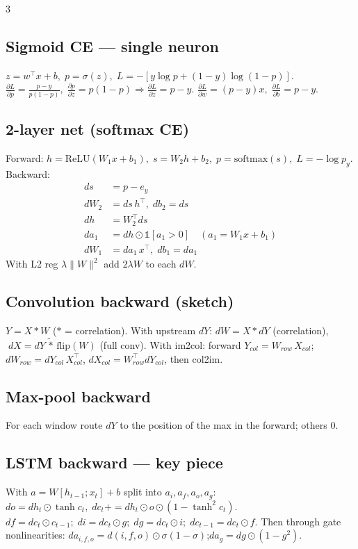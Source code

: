 \documentclass[a4paper,9pt,landscape]{scrartcl}
\newcommand{\softmax}{\mathrm{softmax}}
\newcommand{\relu}{\mathrm{ReLU}}
\newcommand{\dd}[2]{\frac{\partial #1}{\partial #2}}
\begin{document}
\begin{multicols*}{3}
\subsection{Sigmoid CE — single neuron}
$z=w^\top x+b,\;p=\sigma(z),\;L=-[y\log p+(1-y)\log(1-p)]$.
$\dd{L}{p}=\frac{p-y}{p(1-p)},\;\dd{p}{z}=p(1-p)\Rightarrow\dd{L}{z}=p-y$.
$\dd{L}{w}=(p-y)x,\;\dd{L}{b}=p-y$.

\subsection{2-layer net (softmax CE)}
Forward: $h=\relu(W_1 x+b_1),\;s=W_2 h+b_2,\;p=\softmax(s),\;L=-\log p_y$.\\
Backward:
\begin{align*}
ds&=p-e_y\\
dW_2&=ds\,h^\top,\;db_2=ds\\
dh&=W_2^\top ds\\
da_1&=dh\odot\mathbb{1}[a_1>0]\quad(a_1=W_1x+b_1)\\
dW_1&=da_1\,x^\top,\;db_1=da_1
\end{align*}
With L2 reg $\lambda\|W\|^2$ add $2\lambda W$ to each $dW$.

\subsection{Convolution backward (sketch)}
$Y=X\!*\!W$ ($*$ = correlation). With upstream $dY$:
$dW=X\!*\!dY$ (correlation), $\;dX=dY\,\tilde *\,\mathrm{flip}(W)$ (full conv).
With im2col: forward $Y_{col}=W_{row}\,X_{col}$;\,$dW_{row}=dY_{col}\,X_{col}^\top$, $dX_{col}=W_{row}^\top dY_{col}$, then col2im.

\subsection{Max-pool backward}
For each window route $dY$ to the position of the max in the forward; others $0$.

\subsection{LSTM backward — key piece}
With $a=W[h_{t-1};x_t]+b$ split into $a_i,a_f,a_o,a_g$:
$do=dh_t\odot\tanh c_t,\;dc_t\!+=\!dh_t\odot o\odot(1-\tanh^2 c_t)$.
$df=dc_t\odot c_{t-1};\;di=dc_t\odot g;\;dg=dc_t\odot i;\;dc_{t-1}=dc_t\odot f$.
Then through gate nonlinearities: $da_{i,f,o}=d(i,f,o)\odot\sigma(1-\sigma)$;\;$da_g=dg\odot(1-g^2)$.


\end{multicols*}
\end{document}
